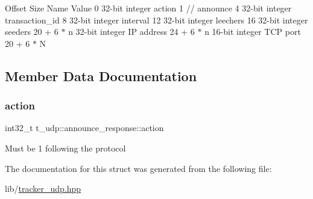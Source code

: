 Offset Size Name Value 0 32-\/bit integer action 1 // announce 4 32-\/bit integer transaction\+\_\+id 8 32-\/bit integer interval 12 32-\/bit integer leechers 16 32-\/bit integer seeders 20 + 6 $\ast$ n 32-\/bit integer IP address 24 + 6 $\ast$ n 16-\/bit integer T\+CP port 20 + 6 $\ast$ N 

\subsection{Member Data Documentation}
\mbox{\label{structt__udp_1_1announce__response_a80aeacfd03e3e64be4218782c6f9b806}} 
\subsubsection{\texorpdfstring{action}{action}}
{\footnotesize\ttfamily int32\+\_\+t t\+\_\+udp\+::announce\+\_\+response\+::action}

Must be 1 following the protocol 

The documentation for this struct was generated from the following file\+:\begin{DoxyCompactItemize}
\item 
lib/\hyperlink{tracker__udp_8hpp}{tracker\+\_\+udp.\+hpp}\end{DoxyCompactItemize}
